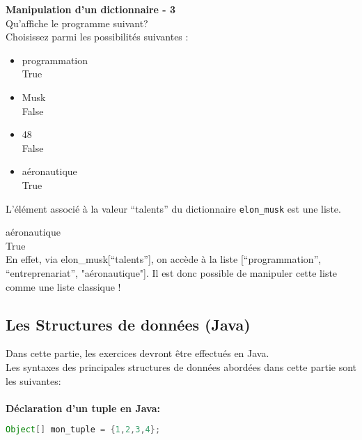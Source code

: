     \begin{Exercice}[5 minutes] \textbf{Manipulation d'un dictionnaire - 3}\\
      	Qu'affiche le programme suivant? \\
       
      	 
      	
      	Choisissez parmi les possibilités suivantes : \\
      	
      	\begin{itemize}
      	\item programmation \\
      	True\\
      	\item Musk \\
      	False\\
      	\item 48 \\
      	False\\
      	\item aéronautique \\
      	True \\
      	\end{itemize}
    
        \begin{conseil}
            L'élément associé à la valeur ``talents'' du dictionnaire \lstinline{elon_musk} est une liste.
        \end{conseil}
        
        \begin{solution}
            aéronautique \\
            True \\
            
            En effet, via elon\_musk[``talents''], on accède à la liste [``programmation'', ``entreprenariat'', "aéronautique"]. Il est donc possible de manipuler cette liste comme une liste classique !
        \end{solution}
    \end{Exercice}
    
    \subsection{Les Structures de données (Java)}
    Dans cette partie, les exercices devront être effectués en Java. \\
    Les syntaxes des principales structures de données abordées dans cette partie sont les suivantes: \\\\
    \textbf{Déclaration d'un tuple en Java:}
     \begin{lstlisting}[language=Java]
              Object[] mon_tuple = {1,2,3,4}; \end{lstlisting} 
              
